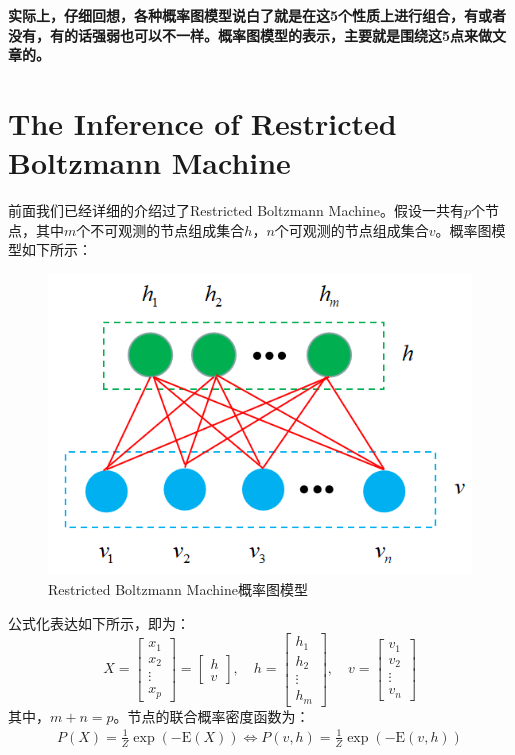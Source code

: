 \documentclass[a4paper]{article}
\begin{document}
\textbf{实际上，仔细回想，各种概率图模型说白了就是在这5个性质上进行组合，有或者没有，有的话强弱也可以不一样。概率图模型的表示，主要就是围绕这5点来做文章的。}

\section{The Inference of Restricted Boltzmann Machine}
前面我们已经详细的介绍过了Restricted Boltzmann Machine。假设一共有$p$个节点，其中$m$个不可观测的节点组成集合$h$，$n$个可观测的节点组成集合$v$。概率图模型如下所示：
\begin{figure}[H]
    \centering
    \includegraphics[width=.45\textwidth]{微信图片_20200229233931.png}
    \caption{Restricted Boltzmann Machine概率图模型}
    \label{fig:my_label_1}
\end{figure}
公式化表达如下所示，即为：
\begin{equation}
    X = \begin{bmatrix}
    x_1 \\
    x_2 \\
    \vdots \\
    x_p
    \end{bmatrix}
    = 
    \begin{bmatrix}
    h \\
    v
    \end{bmatrix}
    ,\quad
    h = 
    \begin{bmatrix}
    h_1 \\
    h_2\\
    \vdots \\
    h_m
    \end{bmatrix}
    ,\quad
    v = 
    \begin{bmatrix}
    v_1 \\
    v_2\\
    \vdots \\
    v_n
    \end{bmatrix}
\end{equation}
其中，$m+n=p$。节点的联合概率密度函数为：
\begin{equation}
    \begin{split}
        P(X) 
        =  \frac{1}{Z} \exp (-\mathrm{E}(X)) 
        \Longleftrightarrow P(v,h) 
        =   \frac{1}{Z} \exp (-\mathrm{E}(v,h)) \\
    \end{split}
\end{equation}
\end{document}
